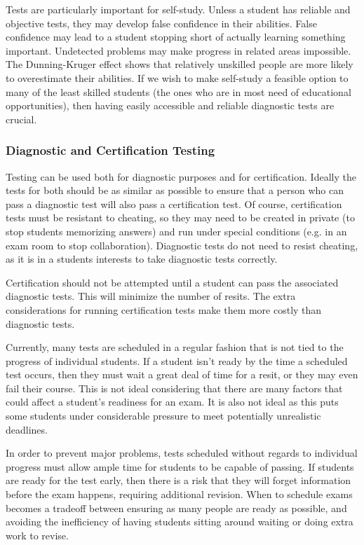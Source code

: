       Tests are particularly important for self-study. Unless a student has reliable and objective tests, they may develop false confidence in their abilities. False confidence may lead to a student stopping short of actually learning something important. Undetected problems may make progress in related areas impossible. The Dunning-Kruger effect shows that relatively unskilled people are more likely to overestimate their abilities.\cite{dunning_kruger} If we wish to make self-study a feasible option to many of the least skilled students (the ones who are in most need of educational opportunities), then having easily accessible and reliable diagnostic tests are crucial.

      \subsubsection{Diagnostic and Certification Testing}
        Testing can be used both for diagnostic purposes and for certification. Ideally the tests for both should be as similar as possible to ensure that a person who can pass a diagnostic test will also pass a certification test. Of course, certification tests must be resistant to cheating, so they may need to be created in private (to stop students memorizing answers) and run under special conditions (e.g. in an exam room to stop collaboration). Diagnostic tests do not need to resist cheating, as it is in a students interests to take diagnostic tests correctly.

        Certification should not be attempted until a student can pass the associated diagnostic tests. This will minimize the number of resits. The extra considerations for running certification tests make them more costly than diagnostic tests.

        Currently, many tests are scheduled in a regular fashion that is not tied to the progress of individual students. If a student isn't ready by the time a scheduled test occurs, then they must wait a great deal of time for a resit, or they may even fail their course. This is not ideal considering that there are many factors that could affect a student's readiness for an exam. It is also not ideal as this puts some students under considerable pressure to meet potentially unrealistic deadlines.

        In order to prevent major problems, tests scheduled without regards to individual progress must allow ample time for students to be capable of passing. If students are ready for the test early, then there is a risk that they will forget information before the exam happens, requiring additional revision. When to schedule exams becomes a tradeoff between ensuring as many people are ready as possible, and avoiding the inefficiency of having students sitting around waiting or doing extra work to revise.


